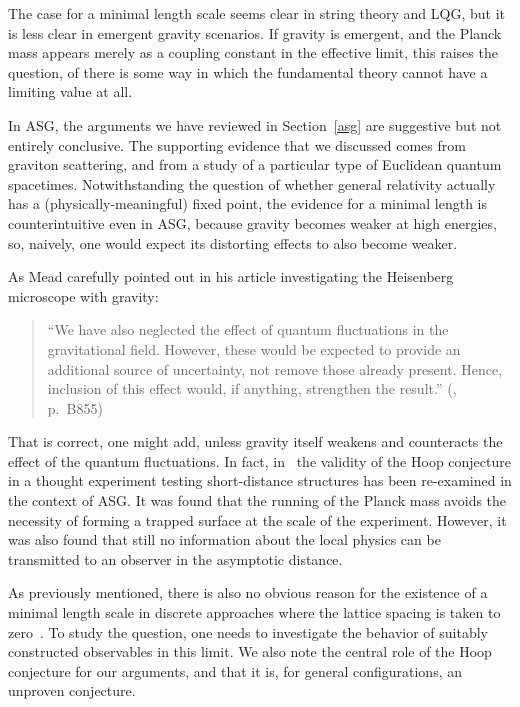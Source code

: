 \documentclass{article}
\begin{document}
The case for a minimal length scale seems clear in
string theory and LQG, but it is less clear in emergent gravity
scenarios. If gravity is emergent, and the Planck
 mass appears merely as a coupling constant in the effective limit, this raises the
question, of there is some way in which the fundamental theory
cannot have a limiting value at all.  

In {\sc ASG}, the arguments we have reviewed in Section~\ref{asg} are suggestive but not entirely conclusive. 
The supporting evidence that we discussed comes from
graviton scattering, and from a study of a particular type of Euclidean quantum spacetimes.%
Notwithstanding the question of whether general relativity actually has a
(physically-meaningful) fixed point, the evidence for a minimal length
is counterintuitive even in {\sc ASG}, because gravity becomes weaker
at high energies, so, naively, one would expect its distorting effects to also become weaker. 

As Mead carefully pointed out in his article investigating the
Heisenberg microscope with gravity:
%
\begin{quote}
``We have also neglected the effect of quantum fluctuations in the
  gravitational field. However, these would be expected to provide an
  additional source of uncertainty, not remove those already
  present. Hence, inclusion of this effect would, if anything,
  strengthen the result.'' (\cite{Mead}, p.~B855)
\end{quote}
%
That is correct, one might add, unless gravity itself weakens and counteracts the effect of the quantum fluctuations.  In fact, 
in~\cite{Basu:2010nf} the validity of the Hoop conjecture in a thought experiment testing short-distance structures
has been re-examined in the context of {\sc ASG}. It was found that the
running of the Planck mass avoids the necessity of forming a trapped surface at the scale of the experiment. However,
it was also found that still no information about the local physics can be transmitted to an observer in the asymptotic
distance.   

As previously mentioned, there is also no obvious reason for the existence of a 
minimal length scale in discrete approaches where the lattice spacing is taken to zero~\cite{Ambjorn:2010rx}. 
To study the question, one needs to investigate the behavior of suitably constructed
observables in this limit. We also note the central role of the Hoop conjecture for
our arguments, and that it is, for general configurations, an unproven conjecture.
\end{document}
